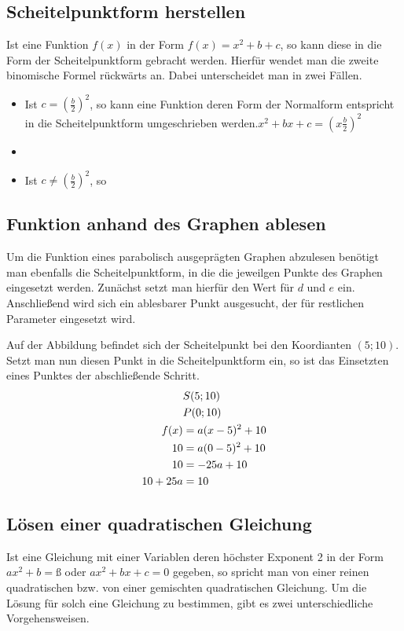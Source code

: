 \subsection{Scheitelpunktform herstellen}
Ist eine Funktion $f(x)$ in der Form $f(x)=x^2+b+c$, so kann diese in die Form der Scheitelpunktform gebracht werden. Hierfür wendet man die zweite binomische Formel rückwärts an. Dabei unterscheidet man in zwei Fällen.  
\begin{itemize}
	\item Ist $c=\left(\frac{b}{2}\right)^2$, so kann eine Funktion deren Form der Normalform entspricht in die Scheitelpunktform umgeschrieben werden.$x^2+bx+c=\left(x\frac{b}{2}\right)^2$
	\item 
	\item Ist $c\neq\left(\frac{b}{2}\right)^2$, so
\end{itemize}
\subsection{Funktion anhand des Graphen ablesen}
Um die Funktion eines parabolisch ausgeprägten Graphen abzulesen benötigt man ebenfalls die Scheitelpunktform, in die die jeweilgen Punkte des Graphen eingesetzt werden. Zunächst setzt man hierfür den Wert für $d$ und $e$ ein. Anschließend wird sich ein ablesbarer Punkt ausgesucht, der für restlichen Parameter eingesetzt wird. 

\begin{beispiel}
	Auf der Abbildung befindet sich der Scheitelpunkt bei den Koordianten $(5;10)$. Setzt man nun diesen Punkt in die Scheitelpunktform ein, so ist das Einsetzten eines Punktes der abschließende Schritt.
	\begin{align}
	\setcounter{equation}{0}
		&S(5;10)\\
		&P(0;10)\\
		f(x)&=a(x-5)^2+10\\
		10&=a(0-5)^2+10\\
		10&=-25a+10\\
		10+25a&=10
	\end{align}
\end{beispiel}
\subsection{Lösen einer quadratischen Gleichung}
Ist eine Gleichung mit einer Variablen deren höchster Exponent 2 in der Form $ax^2+b=ß$ oder $ax^2+bx+c=0$ gegeben, so spricht man von einer reinen quadratischen bzw. von einer gemischten quadratischen Gleichung. Um die Lösung für solch eine Gleichung zu bestimmen, gibt es zwei unterschiedliche Vorgehensweisen.
